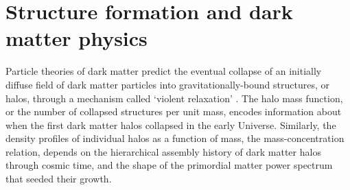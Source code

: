 \section{Structure formation and dark matter physics}
\indent Particle theories of dark matter predict the eventual collapse of an initially diffuse field of dark matter particles into gravitationally-bound structures, or halos, through a mechanism called `violent relaxation' \cite{LyndenBell67}. The halo mass function, or the number of collapsed structures per unit mass, encodes information about when the first dark matter halos collapsed in the early Universe. Similarly, the density profiles of individual halos as a function of mass, the mass-concentration relation, depends on the hierarchical assembly history of dark matter halos through cosmic time, and the shape of the primordial matter power spectrum that seeded their growth.

